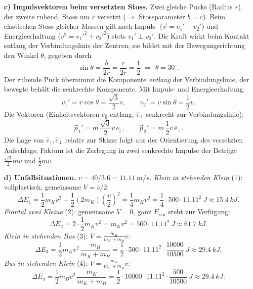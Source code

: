 \textbf{c) Impulsvektoren beim versetzten Stoss.} Zwei gleiche Pucks (Radius $r$),
der zweite ruhend, Stoss um $r$ versetzt ($\Rightarrow$ Stossparameter $b=r$).
Beim elastischen Stoss gleicher Massen gilt nach Impuls- ($\vec v=v_1'+v_2'$)
und Energieerhaltung ($v^2=v_1'^2+v_2'^2$) stets $v_1'\perp v_2'$. Die Kraft
wirkt beim Kontakt entlang der Verbindungslinie der Zentren; sie bildet mit der
Bewegungsrichtung den Winkel $\theta$, gegeben durch
\begin{equation}
  \sin\theta = \frac{b}{2r} = \frac{r}{2r} = \frac12\;\Rightarrow\;\theta=30^{\circ}.
\end{equation}
Der ruhende Puck übernimmt die Komponente \emph{entlang} der Verbindungslinie,
der bewegte behält die senkrechte Komponente. Mit Impuls- und Energieerhaltung:
\begin{equation}
  v_1' = v\cos\theta = \frac{\sqrt3}{2}v,
  \qquad
  v_2' = v\sin\theta = \frac12 v.
\end{equation}
Die Vektoren (Einheitsvektoren $\hat e_{\parallel}$ entlang,
$\hat e_{\perp}$ senkrecht zur Verbindungslinie):
\begin{equation}
  \vec p_1' = m\,\frac{\sqrt3}{2}v\,\hat e_{\parallel},\qquad
  \vec p_2' = m\,\frac12 v\,\hat e_{\perp}.
\end{equation}
Die Lage von $\hat e_{\parallel},\hat e_{\perp}$ relativ zur Skizze folgt aus
der Orientierung des versetzten Aufschlags; Faktum ist die Zerlegung in zwei
senkrechte Impulse der Beträge $\frac{\sqrt3}{2}mv$ und $\frac12 mv$.

\textbf{d) Unfallsituationen.} $v=40/3.6=\qty{11.11}{m/s}$.
\emph{Klein in stehenden Klein} (1): vollplastisch, gemeinsame $V=v/2$:
\begin{equation}
  \Delta E_1=\frac12 m_K v^2 - \frac12 (2m_K)\left(\frac v2\right)^2
  = \frac14 m_K v^2
  = \frac14\cdot 500\cdot 11.11^2\ \si{J}\approx \qty{15.4}{kJ}.
\end{equation}
\emph{Frontal zwei Kleine} (2): gemeinsame $V=0$, ganz $E_\mathrm{vor}$ steht zur
Verfügung:
\begin{equation}
  \Delta E_2 = 2\cdot\frac12 m_K v^2 = m_K v^2
  = 500\cdot 11.11^2\ \si{J}\approx \qty{61.7}{kJ}.
\end{equation}
\emph{Klein in stehenden Bus} (3): $V = \frac{m_K}{m_K+m_B} v$:
\begin{equation}
  \Delta E_3 = \frac12 m_K v^2\,\frac{m_B}{m_K+m_B}
  = \frac12\cdot 500\cdot 11.11^2\cdot\frac{10000}{10500}\ \si{J}
  \approx \qty{29.4}{kJ}.
\end{equation}
\emph{Bus in stehenden Klein} (4): $V = \frac{m_B}{m_K+m_B} v$:
\begin{equation}
  \Delta E_4 = \frac12 m_B v^2\,\frac{m_K}{m_K+m_B}
  = \frac12\cdot 10000\cdot 11.11^2\cdot\frac{500}{10500}\ \si{J}
  \approx \qty{29.4}{kJ}.
\end{equation}

